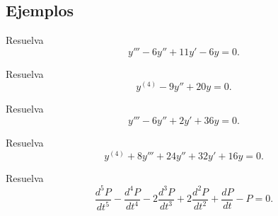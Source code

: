 \subsection{Ejemplos}


\begin{resuelto}
	\label{bron:exmp:10.1}
	Resuelva
	$$
	y'''-6y''+11y'-6y=0.
	$$
\end{resuelto}




\begin{resuelto}
	\label{bron:10.2}
	Resuelva
	$$
	y^{(4)}-9y''+20y=0.
	$$
\end{resuelto}




\begin{resuelto}
	\label{bron:10.4}
	Resuelva
	$$
	y'''-6y''+2y'+36y=0.
	$$
\end{resuelto}




\begin{resuelto}
	\label{bron:10.6}
	Resuelva
	$$
	y^{(4)}+8y'''+24y''+32y'+16y=0.
	$$
\end{resuelto}




\begin{resuelto}
	\label{bron:10.7}
	Resuelva
	$$
	\dfrac{d^{5}P}{dt^{5}}
	-\dfrac{d^{4}P}{dt^{4}}
	-2\dfrac{d^{3}P}{dt^{3}}
	+2\dfrac{d^{2}P}{dt^{2}}
	+\dfrac{dP}{dt}-P=0.
	$$
\end{resuelto}



